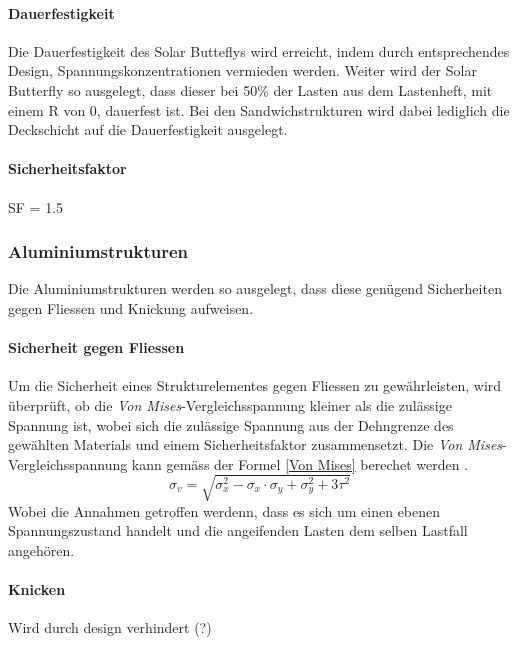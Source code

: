 \paragraph{Dauerfestigkeit}
Die Dauerfestigkeit des Solar Butteflys wird erreicht, indem durch entsprechendes Design, Spannungskonzentrationen vermieden werden. Weiter wird der Solar Butterfly so ausgelegt, dass dieser bei 50\% der Lasten aus dem Lastenheft, mit einem R von 0, dauerfest ist. Bei den Sandwichstrukturen wird dabei lediglich die Deckschicht auf die Dauerfestigkeit ausgelegt.

\paragraph{Sicherheitsfaktor}
SF = 1.5



  \subsubsection{Aluminiumstrukturen}
  Die Aluminiumstrukturen werden so ausgelegt, dass diese genügend Sicherheiten gegen Fliessen und Knickung aufweisen.
  \paragraph{Sicherheit gegen Fliessen}
  Um die Sicherheit eines Strukturelementes gegen Fliessen zu gewährleisten, wird überprüft, ob die \emph{Von Mises}-Vergleichsspannung kleiner als die zulässige Spannung ist, wobei sich die zulässige Spannung aus der Dehngrenze des gewählten Materials und einem Sicherheitsfaktor zusammensetzt. Die \emph{Von Mises}-Vergleichsspannung kann gemäss  der Formel \ref{Von Mises} berechet werden \cite{Baertsch}.
  \begin{equation}
    \label{Von Mises}
    \sigma_v = \sqrt{\sigma_x^{2}-\sigma_x \cdot \sigma_y + \sigma_y^2 + 3\tau^2}
  \end{equation}
  Wobei die Annahmen getroffen werdenn, dass es sich um einen ebenen Spannungszustand handelt und die angeifenden Lasten dem selben Lastfall angehören.

  \paragraph{Knicken}
  Wird durch design verhindert (?)

